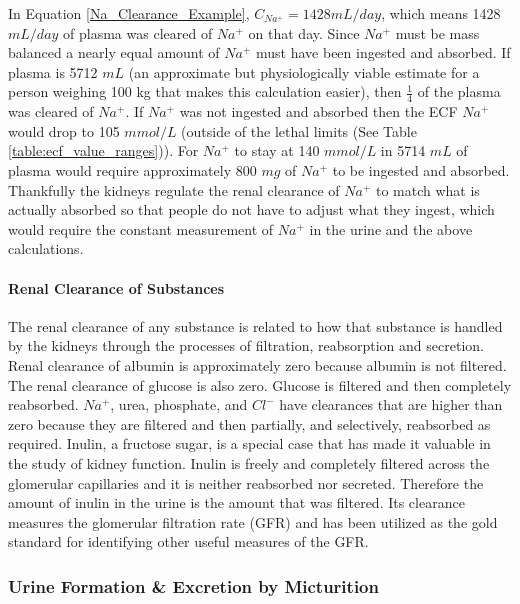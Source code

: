In Equation \ref{Na_Clearance_Example}, $C_{Na^+} = 1428 mL/day$, which means 1428 $mL/day$ of plasma was cleared of $Na^+$ on that day. Since $Na^+$ must be mass balanced a nearly equal amount of $Na^+$ must have been ingested and absorbed. If plasma is 5712 $mL$ (an approximate but physiologically viable estimate for a person weighing 100 kg that makes this calculation easier), then $\frac{1}{4}$ of the plasma was cleared of $Na^+$. If $Na^+$ was not ingested and absorbed then the ECF $Na^+$ would drop to 105 $mmol/L$ (outside of the lethal limits (See Table \ref{table:ecf_value_ranges})). For $Na^+$ to stay at 140 $mmol/L$ in 5714 $mL$ of plasma would require approximately 800 $mg$ of $Na^+$ to be ingested and absorbed.\footnotemark{}
Thankfully the kidneys regulate the renal clearance of $Na^+$ to match what is actually absorbed so that people do not have to adjust what they ingest, which would require the constant measurement of $Na^+$ in the urine and the above calculations.\footnotemark{}

\paragraph{Renal Clearance of Substances}

The renal clearance of any substance is related to how that substance is handled by the kidneys through the processes of filtration, reabsorption and secretion. Renal clearance of albumin is approximately zero because albumin is not filtered. The renal clearance of glucose is also zero. Glucose is filtered and then completely reabsorbed. $Na^+$, urea, phosphate, and $Cl^-$ have clearances that are higher than zero because they are filtered and then partially, and selectively, reabsorbed as required. Inulin, a fructose sugar, is a special case that has made it valuable in the study of kidney function. Inulin is freely and completely filtered across the glomerular capillaries and it is neither reabsorbed nor secreted. Therefore the amount of inulin in the urine is the amount that was filtered. Its clearance measures the glomerular filtration rate (GFR) and has been utilized as the gold standard for identifying other useful measures of the GFR.

\subsubsection{Urine Formation \& Excretion by Micturition}

